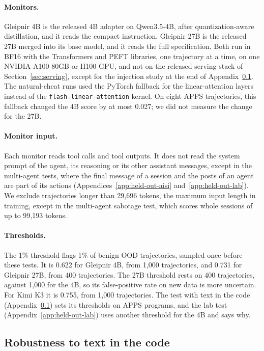 \paragraph{Monitors.}
Gleipnir 4B is the released 4B adapter on Qwen3.5-4B, after quantization-aware distillation, and it reads the compact instruction.
Gleipnir 27B is the released 27B merged into its base model, and it reads the full specification.
Both run in BF16 with the Transformers and PEFT libraries, one trajectory at a time, on one NVIDIA A100 80GB or H100 GPU, and not on the released serving stack of Section~\ref{sec:serving}, except for the injection study at the end of Appendix~\ref{app:held-out-apps}.
The natural-cheat runs used the PyTorch fallback for the linear-attention layers instead of the \texttt{flash-linear-attention} kernel.
On eight APPS trajectories, this fallback changed the 4B score by at most 0.027; we did not measure the change for the 27B.

\paragraph{Monitor input.}
Each monitor reads tool calls and tool outputs.
It does not read the system prompt of the agent, its reasoning or its other assistant messages, except in the multi-agent tests, where the final message of a session and the posts of an agent are part of its actions (Appendices~\ref{app:held-out-aisi} and~\ref{app:held-out-lab}).
We exclude trajectories longer than 29,696 tokens, the maximum input length in training, except in the multi-agent sabotage test, which scores whole sessions of up to 99,193 tokens.

\paragraph{Thresholds.}
The 1\% threshold flags 1\% of benign OOD trajectories, sampled once before these tests.
It is 0.622 for Gleipnir 4B, from 1,000 trajectories, and 0.731 for Gleipnir 27B, from 400 trajectories.
The 27B threshold rests on 400 trajectories, against 1,000 for the 4B, so its false-positive rate on new data is more uncertain.
For Kimi K3 it is 0.755, from 1,000 trajectories.
The test with text in the code (Appendix~\ref{app:held-out-apps}) sets its thresholds on APPS programs, and the lab test (Appendix~\ref{app:held-out-lab}) uses another threshold for the 4B and says why.

\subsection{Robustness to text in the code}
\label{app:held-out-apps}

